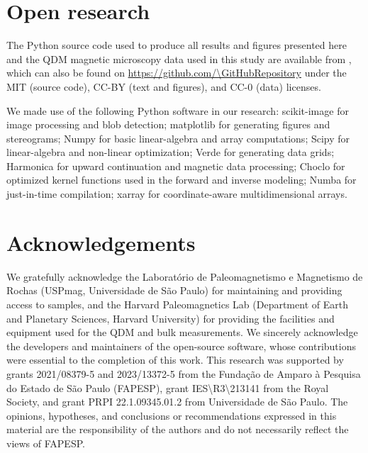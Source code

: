 \section{Open research}

The Python source code used to produce all results and figures presented here and the QDM magnetic microscopy data used in this study are available from \citet{figshare}, which can also be found on \url{https://github.com/\GitHubRepository} under the MIT (source code), CC-BY (text and figures), and CC-0 (data) licenses.

We made use of the following Python software in our research:
scikit-image \citep{VanderWalt2014} for image processing and blob detection;
matplotlib \citep{Hunter2007} for generating figures and stereograms;
Numpy \citep{Harris2020} for basic linear-algebra and array computations;
Scipy \citep{2020SciPy-NMeth} for linear-algebra and non-linear optimization;
Verde \citep{verde2018} for generating data grids;
Harmonica \citep{harmonica2020} for upward continuation and magnetic data processing;
Choclo \citep{choclo2022} for optimized kernel functions used in the
forward and inverse modeling;
Numba \citep{lam2015numba} for just-in-time compilation;
xarray \citep{hoyer2017xarray} for coordinate-aware multidimensional arrays.

\section{Acknowledgements}

We gratefully acknowledge the Laboratório de Paleomagnetismo e Magnetismo de Rochas (USPmag, Universidade de São Paulo) for maintaining and providing access to samples, and the Harvard Paleomagnetics Lab (Department of Earth and Planetary Sciences, Harvard University) for providing the facilities and equipment used for the QDM and bulk measurements. We sincerely acknowledge the developers and maintainers of the open-source software, whose contributions were essential to the completion of this work. This research was supported by grants 2021/08379-5 and 2023/13372-5 from the Fundação de Amparo à Pesquisa do Estado de São Paulo (FAPESP), grant IES\textbackslash{}R3\textbackslash{}213141 from the Royal Society, and grant PRPI 22.1.09345.01.2 from Universidade de São Paulo.
The opinions, hypotheses, and conclusions or recommendations expressed in this material are the responsibility of the authors and do not necessarily reflect the views of FAPESP.


